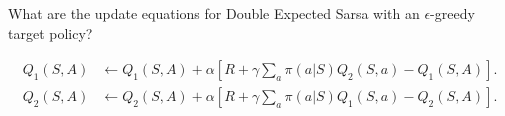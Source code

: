 
\begin{exercise}[Exercise 6.13]

What are the update equations for Double Expected Sarsa with an $\epsilon$-greedy
target policy?

\end{exercise}


\begin{solution}

\begin{align*}
    Q_1(S,A) &\leftarrow Q_1(S,A) + 
    \alpha\left[R + \gamma \sum_{a} \pi(a|S) Q_2(S,a) - Q_1(S,A)\right]. \\
    Q_2(S,A) &\leftarrow Q_2(S,A) + 
    \alpha\left[R + \gamma \sum_{a} \pi(a|S) Q_1(S,a) - Q_2(S,A)\right]. \\
\end{align*}

\end{solution}

